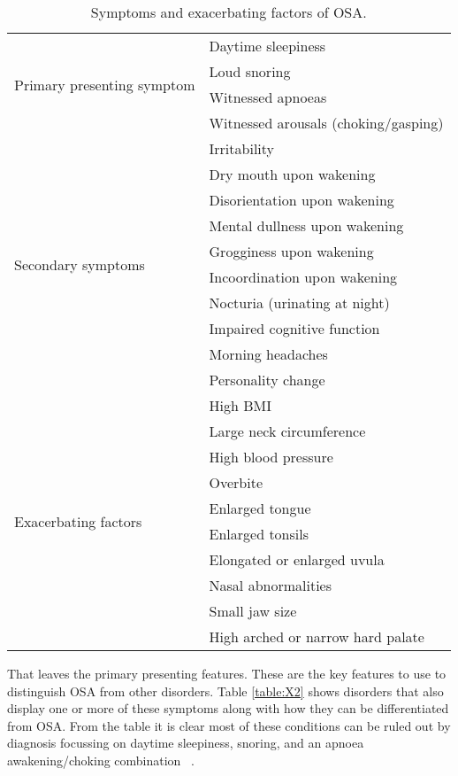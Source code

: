 \begin{table}
\centering
\begin{tabular}{l l}
\toprule
\multirow{4}{*}{Primary presenting symptom}&Daytime sleepiness\\ 
&Loud snoring\\ 
&Witnessed apnoeas\\ 
&Witnessed arousals (choking/gasping)\\ \midrule
\multirow{10}{*}{Secondary symptoms}&Irritability\\ 
&Dry mouth upon wakening\\ 
&Disorientation upon wakening\\ 
&Mental dullness upon wakening\\ 
&Grogginess upon wakening\\ 
&Incoordination upon wakening\\ 
&Nocturia (urinating at night)\\ 
&Impaired cognitive function\\ 
&Morning headaches\\ 
&Personality change\\ \midrule
\multirow{10}{*}{Exacerbating factors}&High BMI\\ 
&Large neck circumference\\ 
&High blood pressure\\ 
&Overbite\\ 
&Enlarged tongue\\ 
&Enlarged tonsils\\ 
&Elongated or enlarged uvula\\ 
&Nasal abnormalities\\ 
&Small jaw size\\ 
&High arched or narrow hard palate\\ \bottomrule
\end{tabular}
\caption{Symptoms and exacerbating factors of OSA.}
\label{table:X4}
\end{table}

That leaves the primary presenting features. These are the key features to use to distinguish OSA from other disorders. Table \ref{table:X2} shows disorders that also display one or more of these symptoms along with how they can be differentiated from OSA. From the table it is clear most of these conditions can be ruled out by diagnosis focussing on daytime sleepiness, snoring, and an apnoea awakening/choking combination ~\cite{american2001international}.

